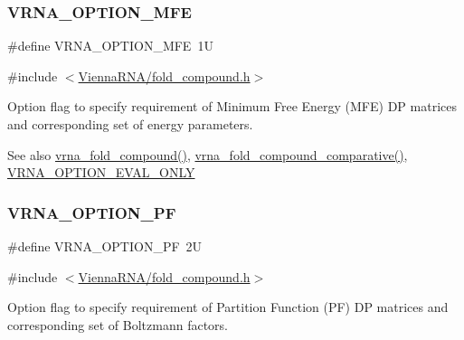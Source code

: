\subsubsection{\texorpdfstring{V\+R\+N\+A\+\_\+\+O\+P\+T\+I\+O\+N\+\_\+\+M\+FE}{VRNA\_OPTION\_MFE}}
{\footnotesize\ttfamily \#define V\+R\+N\+A\+\_\+\+O\+P\+T\+I\+O\+N\+\_\+\+M\+FE~1U}



{\ttfamily \#include $<$\mbox{\hyperlink{fold__compound_8h}{Vienna\+R\+N\+A/fold\+\_\+compound.\+h}}$>$}



Option flag to specify requirement of Minimum Free Energy (M\+FE) DP matrices and corresponding set of energy parameters. 

\begin{DoxySeeAlso}{See also}
\mbox{\hyperlink{group__fold__compound_ga6601d994ba32b11511b36f68b08403be}{vrna\+\_\+fold\+\_\+compound()}}, \mbox{\hyperlink{group__fold__compound_gad6bacc816af274922b13d947f708aa0c}{vrna\+\_\+fold\+\_\+compound\+\_\+comparative()}}, \mbox{\hyperlink{group__fold__compound_ga61469c423131552c8483229f8b6c7e0e}{V\+R\+N\+A\+\_\+\+O\+P\+T\+I\+O\+N\+\_\+\+E\+V\+A\+L\+\_\+\+O\+N\+LY}} 
\end{DoxySeeAlso}
\mbox{\label{group__fold__compound_gabfbadcddda3e74ce7f49035ef8f058f7}} 
\subsubsection{\texorpdfstring{V\+R\+N\+A\+\_\+\+O\+P\+T\+I\+O\+N\+\_\+\+PF}{VRNA\_OPTION\_PF}}
{\footnotesize\ttfamily \#define V\+R\+N\+A\+\_\+\+O\+P\+T\+I\+O\+N\+\_\+\+PF~2U}



{\ttfamily \#include $<$\mbox{\hyperlink{fold__compound_8h}{Vienna\+R\+N\+A/fold\+\_\+compound.\+h}}$>$}



Option flag to specify requirement of Partition Function (PF) DP matrices and corresponding set of Boltzmann factors. 

